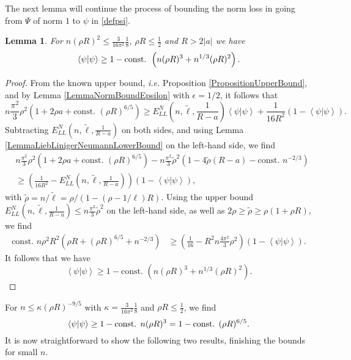\documentclass[a4paper,11pt]{article}
\newcommand{\abs}[1]{\left\lvert #1 \right\rvert}
\renewcommand{\braket}[1]{\left\langle#1\right\rangle}
\newcommand{\ie}{\emph{i.e.} }
\newtheorem{lemma}[theorem]{Lemma}
\numberwithin{equation}{section}
\begin{document}
	
	The next lemma will continue the process of bounding the norm loss in going from $ \Psi $ of norm $ 1 $ to $ \psi $ in \eqref{defpsi}. 
	\begin{lemma}\label{LemmaImprovedMassBound}
	For $ n(\rho R)^2\leq  \frac{3}{16\pi^2}\frac{1}{8} $, $ \rho R\leq \frac{1}{2} $ and $ R>2\abs{a} $ we have
		\begin{equation}\label{EqImprovedMassBound}
		\begin{aligned}
		\braket{\psi|\psi} \geq 1-\textnormal{const. }\left(n(\rho R)^3+n^{1/3}(\rho R)^2\right).
		\end{aligned}
		\end{equation}
	\end{lemma}
	\begin{proof}
		From the known upper bound, \ie Proposition \ref{PropositionUpperBound}, and by Lemma \ref{LemmaNormBoundEpsilon} with $ \epsilon=1/2 $, it follows that 
		\begin{equation}
		n\frac{\pi^2}{3}\rho^2\left(1+2\rho a+\text{const. }(\rho R)^{6/5}\right)\geq E_{LL}^N \left(n,\tilde{\ell},\frac{1}{R-a}\right)\braket{\psi|\psi}+ \frac{1}{16R^2}(1-\braket{\psi|\psi}).
		\end{equation}
		Subtracting $ E_{LL}^N \left(n,\tilde{\ell},\frac{1}{R-a}\right) $ on both sides, and using Lemma \ref{LemmaLiebLinigerNeumannLowerBound} on the left-hand side, we find\begin{equation}
		\begin{aligned}
		&n\frac{\pi^2}{3}\rho^2\left(1+2\rho a+\text{const. }(\rho R)^{6/5}\right)-n\frac{\pi^2}{3}\tilde{\rho}^2\left(1-4\tilde{\rho} (R-a)-\text{const. }n^{-2/3}\right)\\
		&\geq  \left(\frac{1}{16R^2}-E_{LL}^N \left(n,\tilde{\ell},\frac{1}{R-a}\right)\right)(1-\braket{\psi|\psi}),
		\end{aligned}
		\end{equation}
		with $ \tilde{\rho}=n/\tilde{\ell}=\rho/(1-(\rho-1/\ell)R)$.
		Using the upper bound $ E^N_{LL}\left(n,\tilde{\ell},\frac{1}{R-a}\right)\leq n\frac{\pi^2}{3}\tilde{\rho}^2 $ on the left-hand side, as well as $ 2\rho \geq\tilde{\rho}\geq \rho(1+\rho R)$, we find
		\begin{equation}
		\begin{aligned}
		\text{const. }n\rho^2R^2\left(\rho R+(\rho R)^{6/5}+n^{-2/3}\right)&\geq \left(\frac{1}{16}-R^2n\frac{4\pi^2}{3}\rho^2\right)\left(1-\braket{\psi|\psi}\right).
		\end{aligned}
		\end{equation}
		It follows that we have \begin{equation}
		\braket{\psi|\psi}\geq 1-\text{const. }\left(n(\rho R)^3+n^{1/3}(\rho R)^2\right).
		\end{equation}
	\end{proof}
		For $ n\leq \kappa (\rho R)^{-9/5} $ with $ \kappa=\frac{3}{16\pi^2}\frac{1}{8} $ and $ \rho R\leq \frac{1}{2} $, we find \begin{equation}
		\braket{\psi|\psi}\geq 1-\textnormal{const. }n(\rho R)^3=1-\textnormal{const. }(\rho R)^{6/5}.
		\end{equation}
    It is now straightforward to show the following two results, finishing the bounds for small $n$.
	
\end{document}
